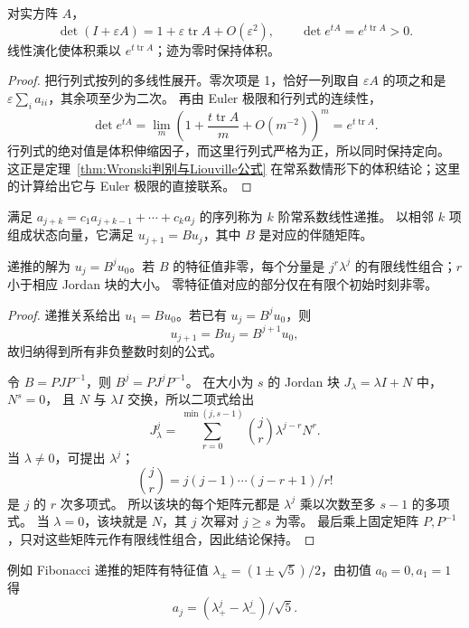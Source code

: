 \begin{proposition}[迹与体积]
对实方阵 $A$，
\[
 \det(I+\varepsilon A)=1+\varepsilon\operatorname{tr}A+O(\varepsilon^2),
 \qquad \det e^{tA}=e^{t\operatorname{tr}A}>0.
\]
线性演化使体积乘以 $e^{t\operatorname{tr}A}$；迹为零时保持体积。
\end{proposition}
\begin{proof}
把行列式按列的多线性展开。零次项是 1，恰好一列取自
$\varepsilon A$ 的项之和是 $\varepsilon\sum_i a_{ii}$，其余项至少为二次。
再由 Euler 极限和行列式的连续性，
\[
 \det e^{tA}=\lim_m
 \left(1+\frac{t\operatorname{tr}A}{m}+O(m^{-2})\right)^m
 =e^{t\operatorname{tr}A}.
\]
行列式的绝对值是体积伸缩因子，而这里行列式严格为正，所以同时保持定向。
这正是定理~\ref{thm:Wronski判别与Liouville公式} 在常系数情形下的体积结论；这里的计算给出它与 Euler 极限的直接联系。
\end{proof}

\begin{definition}[常系数线性递推]
满足 $a_{j+k}=c_1a_{j+k-1}+\cdots+c_ka_j$ 的序列称为 $k$ 阶常系数线性递推。
以相邻 $k$ 项组成状态向量，它满足 $u_{j+1}=Bu_j$，其中 $B$ 是对应的伴随矩阵。
\end{definition}
\begin{proposition}
递推的解为 $u_j=B^ju_0$。若 $B$ 的特征值非零，每个分量是
$j^r\lambda^j$ 的有限线性组合；$r$ 小于相应 Jordan 块的大小。
零特征值对应的部分仅在有限个初始时刻非零。
\end{proposition}
\begin{proof}
递推关系给出 $u_1=Bu_0$。若已有 $u_j=B^ju_0$，则
\[
 u_{j+1}=Bu_j=B^{j+1}u_0,
\]
故归纳得到所有非负整数时刻的公式。

令 $B=PJP^{-1}$，则 $B^j=PJ^jP^{-1}$。
在大小为 $s$ 的 Jordan 块 $J_\lambda=\lambda I+N$ 中，$N^s=0$，
且 $N$ 与 $\lambda I$ 交换，所以二项式给出
\[
 J_\lambda^j=\sum_{r=0}^{\min(j,s-1)}\binom jr\lambda^{j-r}N^r.
\]
当 $\lambda\ne0$，可提出 $\lambda^j$；
\[
 \binom jr=j(j-1)\cdots(j-r+1)/r!
\]
 是 $j$ 的 $r$ 次多项式。
所以该块的每个矩阵元都是 $\lambda^j$ 乘以次数至多 $s-1$ 的多项式。
当 $\lambda=0$，该块就是 $N$，其 $j$ 次幂对 $j\geq s$ 为零。
最后乘上固定矩阵 $P,P^{-1}$，只对这些矩阵元作有限线性组合，因此结论保持。
\end{proof}
例如 Fibonacci 递推的矩阵有特征值
$\lambda_\pm=(1\pm\sqrt5)/2$，由初值 $a_0=0,a_1=1$ 得
\[
 a_j=(\lambda_+^j-\lambda_-^j)/\sqrt5.
\]


